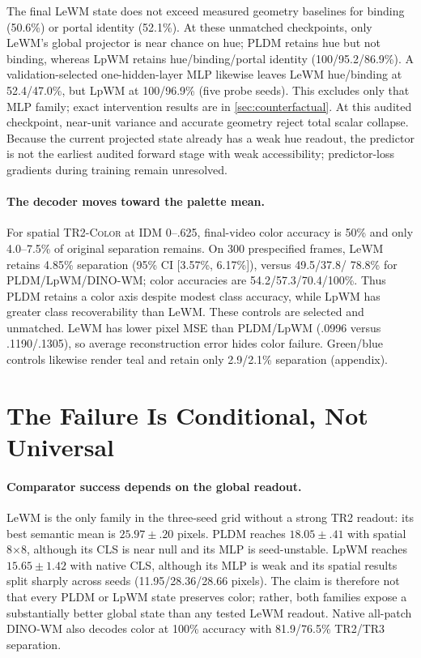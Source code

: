 \documentclass{article}
\newcommand{\trtwo}{\textsc{TR2-Color}}
\newcommand{\dinowm}{\textsc{DINO-WM}}
\begin{document}
The final LeWM state does not exceed measured geometry baselines for binding
(50.6\%) or portal identity (52.1\%).  At these unmatched checkpoints, only
LeWM's global projector is near chance on hue; PLDM retains hue but not binding, whereas LpWM
retains hue/binding/portal identity (100/95.2/86.9\%).  A
validation-selected one-hidden-layer MLP likewise leaves LeWM hue/binding at
52.4/47.0\%, but LpWM at 100/96.9\% (five probe seeds).  This excludes only
that MLP family; exact intervention results are in \cref{sec:counterfactual}.
At this audited checkpoint, near-unit variance and accurate geometry reject
total scalar collapse.  Because the current projected state already has a weak
hue readout, the predictor is not the earliest audited forward stage with weak
accessibility; predictor-loss gradients during training remain unresolved.

\paragraph{The decoder moves toward the palette mean.}
For spatial \trtwo{} at IDM 0--.625, final-video color accuracy is 50\% and
only 4.0--7.5\% of original separation remains.  On 300 prespecified frames,
LeWM retains 4.85\% separation (95\% CI [3.57\%, 6.17\%]), versus 49.5/37.8/
78.8\% for PLDM/LpWM/DINO-WM; color accuracies are 54.2/57.3/70.4/100\%.
Thus PLDM retains a color axis despite modest class accuracy, while LpWM has
greater class recoverability than LeWM.  These controls are selected and
unmatched.  LeWM has lower pixel MSE than PLDM/LpWM (.0996 versus
.1190/.1305), so average reconstruction error hides color failure.  Green/blue
controls likewise render teal and retain only 2.9/2.1\% separation (appendix).

\section{The Failure Is Conditional, Not Universal}

\paragraph{Comparator success depends on the global readout.}
LeWM is the only family in the three-seed grid without a strong TR2 readout:
its best semantic mean is $25.97\pm.20$ pixels.  PLDM reaches
$18.05\pm.41$ with spatial 8$\times$8, although its CLS is near null and its
MLP is seed-unstable.  LpWM reaches $15.65\pm1.42$ with native CLS, although
its MLP is weak and its spatial results split sharply across seeds
(11.95/28.36/28.66 pixels).  The claim is therefore not that every PLDM or
LpWM state preserves color; rather, both families expose a substantially
better global state than any tested LeWM readout.  Native all-patch \dinowm{}
also decodes color at 100\% accuracy with 81.9/76.5\% TR2/TR3 separation.
\end{document}
